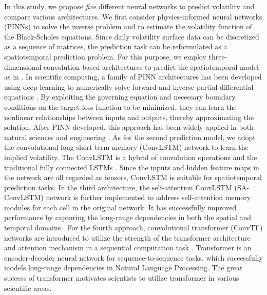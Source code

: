 \documentclass{article}
\begin{document}
In this study, we propose {\it five} different neural networks to predict volatility and compare various architectures.
We first consider physics-informed neural networks (PINNs) to solve the inverse problem and to estimate the volatility function of the Black-Scholes equations. 
Since daily volatility surface data can be discretized as a sequence of matrices, the prediction task can be reformulated as a spatiotemporal prediction problem. 
For this purpose, we employ three-dimensional convolution-based architectures to predict the spatiotemporal model as in \citep{malliaris1996using}. 
In scientific computing, a family of PINN architectures has been developed using deep learning to numerically solve forward and inverse partial differential equations \citep{raissi2019physics, PINN001, PINN002, PINN003}.
By exploiting the governing equation and necessary boundary conditions on the target loss function to be minimized, they can learn the nonlinear relationships between inputs and outputs, thereby approximating the solution. 
After PINN developed, this approach has been widely applied in both natural sciences and engineering \cite{PINNa-001, PINNa-002, PINNa-003, PINNa-004}.
As for the second prediction model, we adopt the convolutional long-short term memory (ConvLSTM) network to learn the implied volatility.
The ConvLSTM is a hybrid of convolution operations and the traditional fully connected LSTMs \citep{shi2015convolutional, convlstm001, convlstm002}. 
Since the inputs and hidden feature maps in the network are all regarded as tensors, ConvLSTM is suitable for spatiotemporal prediction tasks. 
In the third architecture, the self-attention ConvLSTM (SA-ConvLSTM) network is further implemented to address self-attention memory modules for each cell in the original network. 
It has successfully improved performance by capturing the long-range dependencies in both the spatial and temporal domains \citep{lin2020selfattention, sa-lstm-01}.
For the fourth approach, convolutional transformer (ConvTF) networks are introduced to utilize the strength of the transformer architecture and attention mechanism in a sequential computation task \citep{liu2021convtransformer, convtf01}. 
Transformer is an encoder-decoder neural network for sequence-to-sequence tasks, which successfully models long-range dependencies in Natural Language Processing.
The great success of transformer motivates scientists to utilize transformer in various scientific areas.
\end{document}
